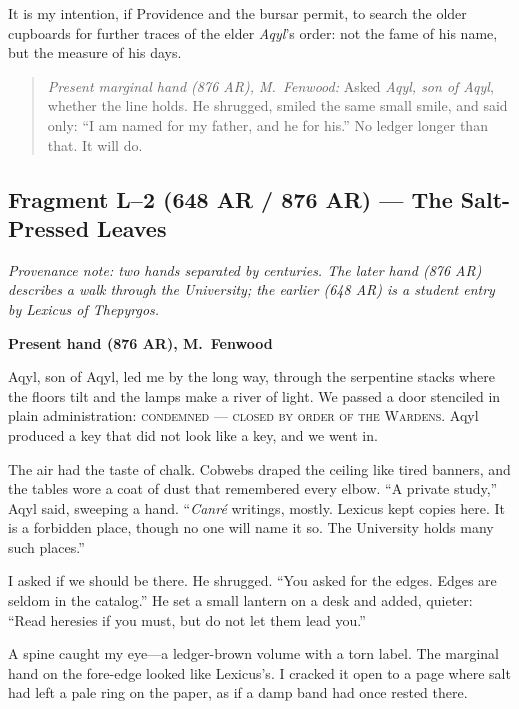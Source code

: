 \documentclass[11pt]{article}
\begin{document}
It is my intention, if Providence and the bursar permit, to search the older cupboards for further traces of the elder \textit{Aqyl}'s order: not the fame of his name, but the measure of his days.

\medskip
\begin{quote}
\textit{Present marginal hand (876 AR), M.\ Fenwood:} Asked \textit{Aqyl, son of Aqyl}, whether the line holds. He shrugged, smiled the same small smile, and said only: ``I am named for my father, and he for his.'' No ledger longer than that. It will do.
\end{quote}

\subsection{Fragment L--2 (648 AR / 876 AR) --- The Salt-Pressed Leaves}
\label{frag:l2}
{}

\noindent\textit{Provenance note: two hands separated by centuries. The later hand (\textit{876 AR}) describes a walk through the University; the earlier (\textit{648 AR}) is a student entry by Lexicus of Thepyrgos.}

\medskip
\noindent\textbf{Present hand (876 AR), M.\ Fenwood}

Aqyl, son of Aqyl, led me by the long way, through the serpentine stacks where the floors tilt and the lamps make a river of light. We passed a door stenciled in plain administration: \textsc{condemned --- closed by order of the Wardens}. Aqyl produced a key that did not look like a key, and we went in.

The air had the taste of chalk. Cobwebs draped the ceiling like tired banners, and the tables wore a coat of dust that remembered every elbow. ``A private study,'' Aqyl said, sweeping a hand. ``\emph{Canr\'e} writings, mostly. Lexicus kept copies here. It is a forbidden place, though no one will name it so. The University holds many such places.''

I asked if we should be there. He shrugged. ``You asked for the edges. Edges are seldom in the catalog.'' He set a small lantern on a desk and added, quieter: ``Read heresies if you must, but do not let them lead you.''

A spine caught my eye---a ledger-brown volume with a torn label. The marginal hand on the fore-edge looked like Lexicus's. I cracked it open to a page where salt had left a pale ring on the paper, as if a damp band had once rested there.
\end{document}
